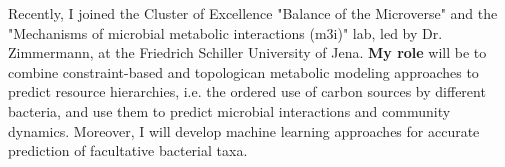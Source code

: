 \documentclass[
    a4paper,
]{../fortysecondscv}
\begin{document}
\makefrontsidebar



   \begin{cvtable}[3]

        {
            Recently, I joined the Cluster of Excellence "Balance of the Microverse" and the "Mechanisms of microbial metabolic interactions (m3i)" lab, led by Dr. Zimmermann, at the Friedrich Schiller University of Jena. 
            \textbf{My role} will be to combine constraint-based and topologican metabolic modeling approaches to predict resource hierarchies, i.e. the ordered use of carbon sources by different bacteria, and use them to predict microbial interactions and community dynamics. 
            Moreover, I will develop machine learning approaches for accurate prediction of facultative bacterial taxa.
        }
    \end{cvtable}


\end{document}
